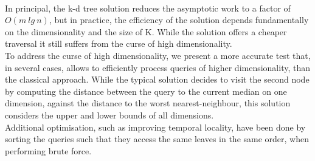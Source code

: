 \\[2mm]
In principal, the k-d tree solution reduces the asymptotic work to a factor of $O(m\ lg\ n)$, but in practice, the efficiency of the solution depends fundamentally on the dimensionality and the size of K. While the solution offers a cheaper traversal it still suffers from the curse of high dimensionality. 
\\[2mm]
To address the curse of high dimensionality, we present a more accurate test that, in several cases, allows to efficiently process queries of higher dimensionality, than the classical approach. While the typical solution decides to visit the second node by computing the distance between the query to the current median on one dimension, against the distance to the worst nearest-neighbour, this solution considers the upper and lower bounds of all dimensions. 
\\[2mm]
Additional optimisation, such as improving temporal locality, have been done by sorting the queries such that they access the same leaves in the same order, when performing brute force.
\\
~~






